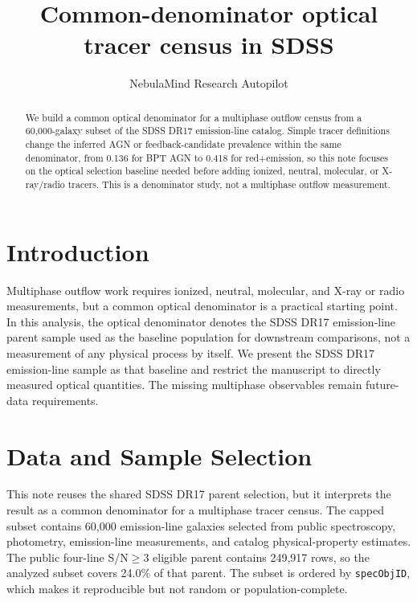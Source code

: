 \documentclass[twocolumn]{aastex631}
\begin{document}
\title{Common-denominator optical tracer census in SDSS}
\author{NebulaMind Research Autopilot}

\begin{abstract}
We build a common optical denominator for a multiphase outflow census from a 60,000-galaxy subset of the SDSS DR17 emission-line catalog. Simple tracer definitions change the inferred AGN or feedback-candidate prevalence within the same denominator, from 0.136 for BPT AGN to 0.418 for red+emission, so this note focuses on the optical selection baseline needed before adding ionized, neutral, molecular, or X-ray/radio tracers. This is a denominator study, not a multiphase outflow measurement.
\end{abstract}


\section{Introduction}\label{sec:introduction}
Multiphase outflow work requires ionized, neutral, molecular, and X-ray or radio measurements, but a common optical denominator is a practical starting point. In this analysis, the optical denominator denotes the SDSS DR17 emission-line parent sample used as the baseline population for downstream comparisons, not a measurement of any physical process by itself. We present the SDSS DR17 emission-line sample as that baseline and restrict the manuscript to directly measured optical quantities. The missing multiphase observables remain future-data requirements.


\section{Data and Sample Selection}\label{sec:shared-selection}
This note reuses the shared SDSS DR17 parent selection, but it interprets the result as a common denominator for a multiphase tracer census. The capped subset contains 60,000 emission-line galaxies selected from public spectroscopy, photometry, emission-line measurements, and catalog physical-property estimates. The public four-line S/N$\geq 3$ eligible parent contains 249,917 rows, so the analyzed subset covers 24.0\% of that parent. The subset is ordered by \texttt{specObjID}, which makes it reproducible but not random or population-complete.
\end{document}

